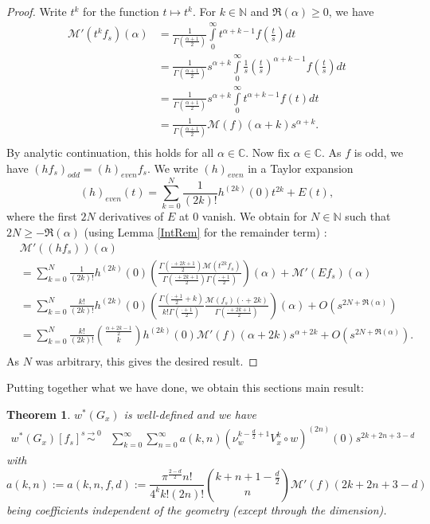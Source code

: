 \documentclass[11pt]{article}
\def\C{{\mathbb{C}}}
\def\N{{\mathbb{N}}}
\def\insum#1{\sum\limits_{#1=0}^\infty}
\def\intP{\int\limits_0^\infty}
\def\M{\mathcal{M}}
\newtheorem{thm}[df]{Theorem}
\begin{document}
\begin{proof}	
	Write $t^k$ for the function $t\mapsto t^k$. For $k\in \N$ and $\Re(\alpha)\geq 0$, we have 
	\begin{align*}
		\M' (t^k f_s)(\alpha)&=\frac{1}{\Gamma(\frac{\alpha+1}{2})}\intP t^{\alpha+k-1}f\left(\frac{t}{s}\right)dt\\
		&=\frac{1}{\Gamma(\frac{\alpha+1}{2})}s^{\alpha+k}\intP\frac{1}{s}\left( \frac{t}{s}\right)^{\alpha+k-1}f\left(\frac{t}{s}\right)dt\\
		&=\frac{1}{\Gamma(\frac{\alpha+1}{2})}s^{\alpha+k}\intP t^{\alpha+k-1}f(t)dt\\
		&= \frac{1}{\Gamma(\frac{\alpha+1}{2})}\M(f)(\alpha+k)s^{\alpha+k}.\\
	\end{align*}
	By analytic continuation, this holds for all $\alpha\in \C$. Now fix $\alpha\in \C$. As $f$ is odd, we have $(hf_s)_{odd}=(h)
	_{even}f_s$.
	We write $(h)_{even}$ in a Taylor expansion
	\[(h)_{even}(t)=\sum\limits_{k=0}^N\frac{1}{(2k)!}h^{(2k)}(0)t^{2k}+ E(t),\]
	where the first $2N$ derivatives of $E$ at $0$ vanish.
	We obtain for $N\in \N$ such that $2N\geq-\Re(\alpha)$ (using Lemma \ref{IntRem} for the remainder term) :
	\begin{align*}
		&\M'((hf_s))(\alpha)\\
		&=\sum\limits_{k=0}^N\frac{1}{(2k)!}h^{(2k)}(0)  \left(\frac{\Gamma(\frac{\cdot+2k+1}{2})\M (t^{2k}f_s)}{\Gamma(\frac{\cdot+2k+1}{2})\Gamma(\frac{\cdot+1}{2})}\right)(\alpha)
		+ \M' ( Ef_s)(\alpha)\\
		&=\sum\limits_{k=0}^N\frac{k!}{(2k)!}h^{(2k)}(0)  \left(\frac{\Gamma(\frac{\cdot+1}{2}+k)}{k!\Gamma(\frac{\cdot+1}{2})}\frac{\M (f_s)(\cdot+2k)}{\Gamma(\frac{\cdot+2k+1}{2})}\right)(\alpha)
		+ O(s^{2N+\Re(\alpha)})\\
		&=\sum\limits_{k=0}^N\frac{k!}{(2k)!}\binom{\frac{\alpha+2k-1}{2}}{k}h^{(2k)}(0) \M'(f)(\alpha+2k)s^{\alpha+2k}+ O(s^{2N+\Re(\alpha)}).\\
	\end{align*}
	As $N$ was arbitrary, this gives the desired result.
\end{proof}



Putting together what we have done, we obtain this sections main result:
\begin{thm}
	\label{intexp}
	\label{dfan}
	$w^*(G_x)$ is well-defined and we have
	\begin{align*}
		w^*(G_x)[f_s]\stackrel{s\rightarrow 0}{\sim}&\insum{k}\insum{n}a(k,n)\left(\nu_w^{k-\tfrac{d}{2}+1}V^{k}_x\circ w\right)^{(2n)}(0)s^{2k+2n+3-d}
	\end{align*}
	with 
	\[a(k,n):=a(k,n,f,d):=\frac{\pi^\frac{2-d}{2}n!}{4^kk!(2n)!} \binom{k+n+1-\frac{d}{2}}{n} \M'(f)({2k+2n+3-d})\]
	being coefficients independent of the geometry (except through the dimension).
\end{thm}
\end{document}
